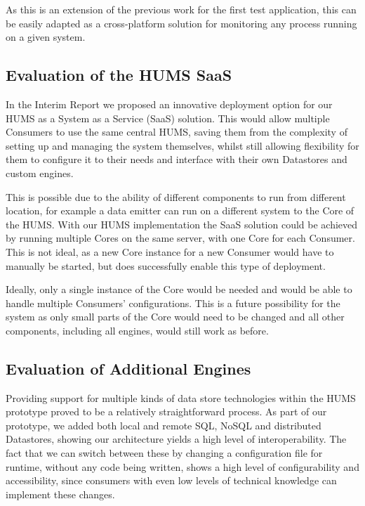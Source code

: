 \documentclass[10pt,a4paper]{article}
\begin{document}
As this is an extension of the previous work for the first test application, this can be easily adapted as a cross-platform solution for monitoring any process running on a given system. 

\subsection{Evaluation of the HUMS SaaS}
\label{sec:hums_saas}

In the Interim Report we proposed an innovative deployment option for our HUMS as a System as a Service (SaaS) solution. This would allow multiple Consumers to use the same central HUMS, saving them from the complexity of setting up and managing the system themselves, whilst still allowing flexibility for them to configure it to their needs and interface with their own Datastores and custom engines.

This is possible due to the ability of different components to run from different location, for example a data emitter can run on a different system to the Core of the HUMS. With our HUMS implementation the SaaS solution could be achieved by running multiple Cores on the same server, with one Core for each Consumer. This is not ideal, as a new Core instance for a new Consumer would have to manually be started, but does successfully enable this type of deployment.

Ideally, only a single instance of the Core would be needed and would be able to handle multiple Consumers' configurations. This is a future possibility for the system as only small parts of the Core would need to be changed and all other components, including all engines, would still work as before.

\subsection{Evaluation of Additional Engines}
\label{sec:additional}

Providing support for multiple kinds of data store technologies within the HUMS prototype proved to be a relatively straightforward process. As part of our prototype, we added both local and remote SQL, NoSQL and distributed Datastores, showing our architecture yields a high level of interoperability. The fact that we can switch between these by changing a configuration file for runtime, without any code being written, shows a high level of configurability and accessibility, since consumers with even low levels of technical knowledge can implement these changes.
\end{document}
